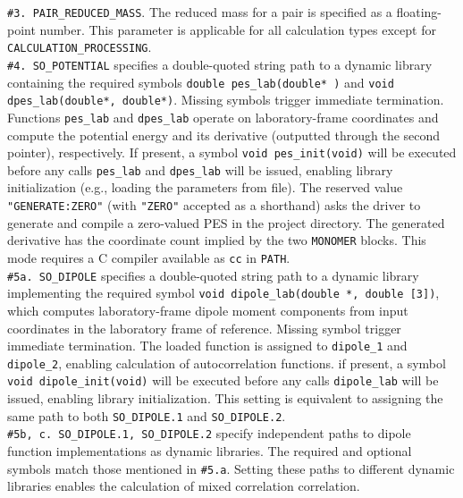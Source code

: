 \documentclass[color]{article}
\begin{document}
\noindent
\texttt{\#3. PAIR\_REDUCED\_MASS}. The reduced mass for a pair is specified as a floating-point number. This parameter is applicable for all calculation types except for \texttt{CALCULATION\_PROCESSING}. \\

\noindent
\texttt{\#4. SO\_POTENTIAL} specifies a double-quoted string path to a dynamic library containing the required symbols \texttt{double pes\_lab(double* )} and \texttt{void dpes\_lab(double*, double*)}. Missing symbols trigger immediate termination. Functions \texttt{pes\_lab} and \texttt{dpes\_lab} operate on laboratory-frame coordinates and compute the potential energy and its derivative (outputted through the second pointer), respectively. If present, a symbol \texttt{void pes\_init(void)} will be executed before any calls \texttt{pes\_lab} and \texttt{dpes\_lab} will be issued, enabling library initialization (e.g., loading the parameters from file). The reserved value \texttt{"GENERATE:ZERO"} (with \texttt{"ZERO"} accepted as a shorthand) asks the driver to generate and compile a zero-valued PES in the project directory. The generated derivative has the coordinate count implied by the two \texttt{MONOMER} blocks. This mode requires a C compiler available as \texttt{cc} in \texttt{PATH}. \\

\noindent
\texttt{\#5a. SO\_DIPOLE} specifies a double-quoted string path to a dynamic library implementing the required symbol \texttt{void dipole\_lab(double *, double [3])}, which computes laboratory-frame dipole moment components from input coordinates in the laboratory frame of reference. Missing symbol trigger immediate termination. The loaded function is assigned to \texttt{dipole\_1} and \texttt{dipole\_2}, enabling calculation of autocorrelation functions. if present, a symbol \texttt{void dipole\_init(void)} will be executed before any calls \texttt{dipole\_lab} will be issued, enabling library initialization. This setting  is equivalent to assigning the same path to both \texttt{SO\_DIPOLE.1} and \texttt{SO\_DIPOLE.2}. \\

\noindent
\texttt{\#5b, c. SO\_DIPOLE.1, SO\_DIPOLE.2} specify independent paths to dipole function implementations as dynamic libraries. The required and optional symbols match those mentioned in \texttt{\#5.a}. Setting these paths to different dynamic libraries enables the calculation of mixed correlation correlation. \\ 
\end{document}
